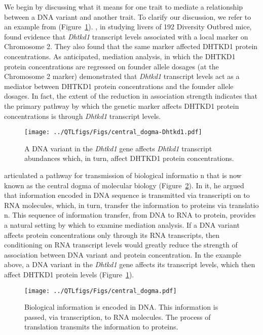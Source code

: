 \documentclass[oneside]{book}
\begin{document}
We begin by discussing what it means for one trait to mediate a relationship between a 
DNA variant and another trait. To clarify our discussion, we refer to an example from 
\citet{chick2016defining} (Figure~\ref{fig:Dhtkd1}). \citet{chick2016defining}, in 
studying livers of 192 Diversity Outbred mice, found evidence that \emph{Dhtkd1} 
transcript levels associated with a local marker on Chromosome 2. They also found that 
the same marker affected DHTKD1 protein concentrations. 
As anticipated, mediation analysis, in which the DHTKD1 protein concentrations are
regressed on founder allele dosages (at the Chromosome 2 marker) demonstrated that
\emph{Dhtkd1} transcript levels act as a mediator between DHTKD1 protein concentrations 
and the founder allele dosages. In fact, the extent of the reduction in association 
strength indicates that the primary pathway by which the genetic marker affects DHTKD1 
protein concentrations is through \emph{Dhtkd1} transcript levels.

\begin{figure}
  \centering
  \texttt{[image: ../QTLfigs/Figs/central\_dogma-Dhtkd1.pdf]}
  \caption{A DNA variant in the \emph{Dhtkd1} gene affects \emph{Dhtkd1} transcript abundances which, in turn, affect DHTKD1 protein concentrations.}\label{fig:Dhtkd1}
\end{figure}




\citet{crick1958protein} articulated a pathway for transmission of biological informatio
n that is now known as the central dogma of molecular biology (Figure~\ref{fig:dogma}). 
In it, he argued that information encoded in DNA sequence is transmitted via transcripti
on to RNA molecules, which, in turn, transfer the information to proteins via translatio
n. This sequence of information transfer, from DNA to RNA to protein, provides a natural 
setting by which to examine mediation analysis. If a DNA variant affects protein 
concentrations only through its RNA transcripts, then conditioning on RNA transcript 
levels would greatly reduce the strength of association between DNA variant and protein 
concentration. In the example above, a DNA variant in the \emph{Dhtkd1} gene affects its 
transcript levels, which then affect DHTKD1 protein levels (Figure~\ref{fig:Dhtkd1}).




\begin{figure}
  \centering
  \texttt{[image: ../QTLfigs/Figs/central\_dogma.pdf]}
  \caption{Biological information is encoded in DNA. This information is passed, via transcription, to RNA molecules. The process of translation transmits the information to proteins.}\label{fig:dogma}
\end{figure}
\end{document}
